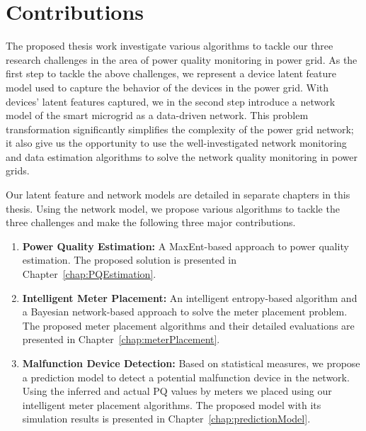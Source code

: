 \section{Contributions}
The proposed thesis work investigate various algorithms to tackle our three research challenges in the area of power quality monitoring in power grid. As the first step to tackle the above challenges, we represent a device latent feature model used to capture the behavior of the devices in the power grid. With devices' latent features captured, we in the second step introduce a network model of the smart microgrid as a data-driven network. This problem transformation significantly simplifies the complexity of the power grid network; it also give us the opportunity to use the well-investigated network monitoring and data estimation algorithms to solve the network quality monitoring in power grids.

Our latent feature and network models are detailed in separate chapters in this thesis. Using the network model, we propose various algorithms to tackle the three challenges and make the following three major contributions.

\begin{enumerate}
\item \textbf{Power Quality Estimation:} A MaxEnt-based approach to power quality estimation. The proposed solution is presented in Chapter~\ref{chap:PQEstimation}.
\item \textbf{Intelligent Meter Placement:} An intelligent entropy-based algorithm and a Bayesian network-based approach to solve the meter placement problem. The proposed meter placement algorithms and their detailed evaluations are presented in Chapter~\ref{chap:meterPlacement}.
\item \textbf{Malfunction Device Detection:} Based on statistical measures, we propose a prediction model to detect a potential malfunction device in the network. Using the inferred and actual PQ values by meters we placed using our intelligent meter placement algorithms. The proposed model with its simulation results is presented in Chapter~\ref{chap:predictionModel}.
\end{enumerate}

